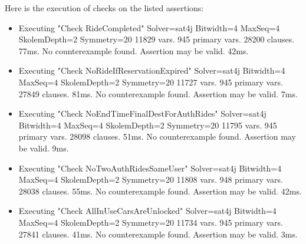

Here is the execution of checks on the listed assertions:
\begin{itemize}
\item[] Executing "Check RideCompleted"
   Solver=sat4j Bitwidth=4 MaxSeq=4 SkolemDepth=2 Symmetry=20
   11829 vars. 945 primary vars. 28200 clauses. 77ms.
   No counterexample found. Assertion may be valid. 42ms.

\item[] Executing "Check NoRideIfReservationExpired"
   Solver=sat4j Bitwidth=4 MaxSeq=4 SkolemDepth=2 Symmetry=20
   11727 vars. 945 primary vars. 27849 clauses. 81ms.
   No counterexample found. Assertion may be valid. 7ms.

\item[] Executing "Check NoEndTimeFinalDestForAuthRides"
   Solver=sat4j Bitwidth=4 MaxSeq=4 SkolemDepth=2 Symmetry=20
   11795 vars. 945 primary vars. 28098 clauses. 51ms.
   No counterexample found. Assertion may be valid. 9ms.

\item[] Executing "Check NoTwoAuthRidesSameUser"
   Solver=sat4j Bitwidth=4 MaxSeq=4 SkolemDepth=2 Symmetry=20
   11808 vars. 948 primary vars. 28038 clauses. 55ms.
   No counterexample found. Assertion may be valid. 42ms.

\item[] Executing "Check AllInUseCarsAreUnlocked"
   Solver=sat4j Bitwidth=4 MaxSeq=4 SkolemDepth=2 Symmetry=20
   11734 vars. 945 primary vars. 27841 clauses. 41ms.
   No counterexample found. Assertion may be valid. 3ms.
\end{itemize}
